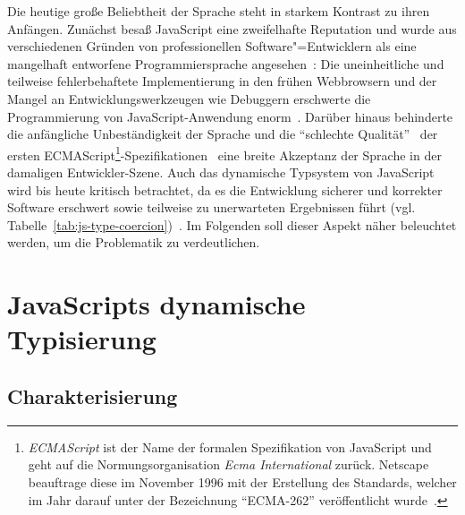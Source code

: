 Die heutige große Beliebtheit der Sprache steht in starkem Kontrast zu ihren Anfängen. Zunächst besaß JavaScript eine zweifelhafte Reputation und wurde aus verschiedenen Gründen von professionellen Software"=Entwicklern als eine mangelhaft entworfene Programmiersprache angesehen~\autocite{CROCKFORD:JS_POPULAR}: Die uneinheitliche und teilweise fehlerbehaftete Implementierung in den frühen Webbrowsern und der Mangel an Entwicklungswerkzeugen wie Debuggern erschwerte die Programmierung von JavaScript-Anwendung enorm~\autocite{OREILLY:JS_HOW_DID_WE_GET_THERE}. Darüber hinaus behinderte die anfängliche Unbeständigkeit der Sprache und die \enquote{schlechte Qualität}~\autocite{CROCKFORD:JS_MISUNDERSTOOD} der ersten ECMAScript\footnote{\textit{ECMAScript} ist der Name der formalen Spezifikation von JavaScript und geht auf die Normungsorganisation \textit{Ecma International} zurück. Netscape beauftrage diese im November 1996 mit der Erstellung des Standards, welcher im Jahr darauf unter der Bezeichnung \enquote{ECMA-262} veröffentlicht wurde~\autocite{ECMASCRIPT:1997}.}-Spezifikationen~\autocite{ECMASCRIPT:1997} eine breite Akzeptanz der Sprache in der damaligen Entwickler-Szene. Auch das dynamische Typsystem von JavaScript wird bis heute kritisch betrachtet, da es die Entwicklung sicherer und korrekter Software erschwert sowie teilweise zu unerwarteten Ergebnissen führt (vgl. Tabelle~\ref{tab:js-type-coercion})~\autocite{NIKHIL:2014,PRADEL:2015}. Im Folgenden soll dieser Aspekt näher beleuchtet werden, um die Problematik zu verdeutlichen.

\section{JavaScripts dynamische Typisierung}

\subsection{Charakterisierung}

